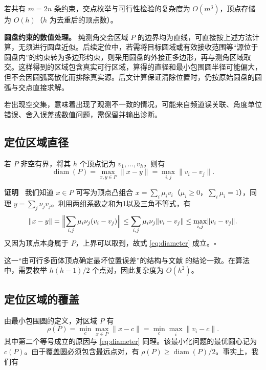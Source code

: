 \documentclass[UTF8,a4paper,zihao=-4,fontset=none]{ctexart}
\begin{document}
若共有 \(m=2n\) 条约束，交点枚举与可行性检验的复杂度为 \(O(m^3)\)，顶点存储为 \(O(h)\)（\(h\) 为去重后的顶点数）。

\textbf{圆盘约束的数值处理。} 纯测角交会区域 \(P\) 的边界均为直线，可直接按上述方法计算，无须进行圆盘近似。后续定位中，若需将目标圆域或有效接收范围等“源位于圆盘内”的约束转为多边形约束，则采用圆盘的外接正多边形，再与测角区域取交。这样得到的区域包含真实可行区域，算得的直径和最小包围圆半径可能偏大，但不会因圆弧离散化而排除真实源。后文计算保证清除位置时，仍按原始圆盘的圆弧与交点直接求解。

若出现空交集，意味着出现了观测不一致的情况，可能来自频道误关联、角度单位错误、舍入误差或数值问题，需保留并输出诊断。

\subsection{定位区域直径}

若 \(P\) 非空有界，将其 \(h\) 个顶点记为 \(v_1,\dots,v_h\)，则有
\begin{equation}
  \operatorname{diam}(P)=\max_{x,y\in P}\lVert x-y\rVert=\max_{i,j}\lVert v_i-v_j\rVert .
  \label{eq:diameter}
\end{equation}

\textbf{证明\ } 我们知道 \(x\in P\) 可写为顶点凸组合 \(x=\sum_i\mu_iv_i\)（\(\mu_i\ge0\)，\(\sum_i\mu_i=1\)），同理 \(y=\sum_j\nu_jv_j\)。利用两组系数之和为1以及三角不等式，有
\begin{equation}
  \lVert x-y\rVert
  =\Bigl\lVert\sum_{i,j}\mu_i\nu_j(v_i-v_j)\Bigr\rVert
  \le\sum_{i,j}\mu_i\nu_j\lVert v_i-v_j\rVert
  \le\max_{i,j}\lVert v_i-v_j\rVert .
\end{equation}
又因为顶点本身属于 \(P\)，上界可以取到，故式 \eqref{eq:diameter} 成立。\(\square\) 

这一“由可行多面体顶点确定最坏位置误差”的结构与文献 \cite{Gholami2015} 的结论一致。在算法中，需要枚举 \(h(h-1)/2\) 个点对，因此复杂度为 \(O(h^2)\)。

\subsection{定位区域的覆盖}

由最小包围圆的定义，对区域 \(P\) 有
\begin{equation}
  \rho(P)=\min_c\max_{x\in P}\lVert x-c\rVert
  =\min_c\max_i\lVert v_i-c\rVert .
  \label{eq:mincircle}
\end{equation}
其中第二个等号成立的原因与 \eqref{eq:diameter} 同理。该最小化问题的最优圆心记为 \(c(P)\)。由于覆盖圆必须包含最远点对，有 \(\rho(P)\ge\operatorname{diam}(P)/2\)。事实上，我们有
\end{document}
